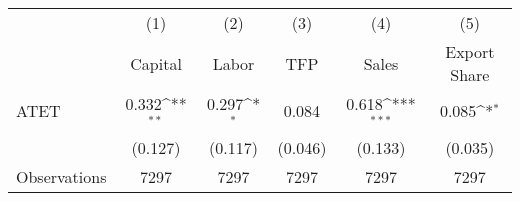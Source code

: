 {
\def\sym#1{\ifmmode^{#1}\else\(^{#1}\)\fi}
\begin{tabular}{l*{5}{c}}
\hline\hline
                    &\multicolumn{1}{c}{(1)}&\multicolumn{1}{c}{(2)}&\multicolumn{1}{c}{(3)}&\multicolumn{1}{c}{(4)}&\multicolumn{1}{c}{(5)}\\
                    &\multicolumn{1}{c}{Capital}&\multicolumn{1}{c}{Labor}&\multicolumn{1}{c}{TFP}&\multicolumn{1}{c}{Sales}&\multicolumn{1}{c}{Export Share}\\
\hline
ATET                &       0.332\sym{**} &       0.297\sym{*}  &       0.084         &       0.618\sym{***}&       0.085\sym{*}  \\
                    &     (0.127)         &     (0.117)         &     (0.046)         &     (0.133)         &     (0.035)         \\
\hline
Observations        &        7297         &        7297         &        7297         &        7297         &        7297         \\
\hline\hline
\end{tabular}
}
